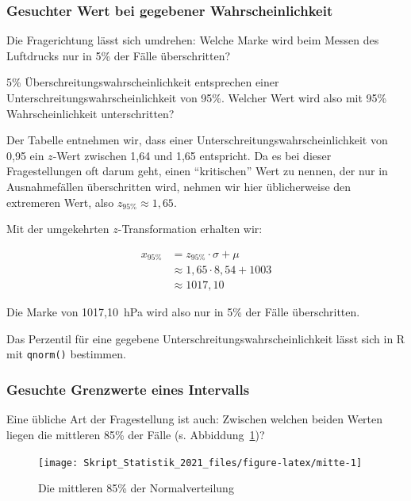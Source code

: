 \documentclass[
  11pt,
  ngerman,
  a4paper,
]{report}
\newenvironment{rtip}{
  \medskip
  \begin{tcolorbox}[colframe=purple,colback=light_gray,title=Softwarehinweis]
}{
  \end{tcolorbox}
  \medskip
}
\begin{document}
\hypertarget{gesuchter-wert-bei-gegebener-wahrscheinlichkeit}{%
\subsubsection{Gesuchter Wert bei gegebener Wahrscheinlichkeit}\label{gesuchter-wert-bei-gegebener-wahrscheinlichkeit}}

Die Fragerichtung lässt sich umdrehen: Welche Marke wird beim Messen des Luftdrucks nur in 5\% der Fälle überschritten?

5\% Überschreitungswahrscheinlichkeit entsprechen einer Unterschreitungswahrscheinlichkeit von 95\%. Welcher Wert wird also mit 95\% Wahrscheinlichkeit unterschritten?

Der Tabelle entnehmen wir, dass einer Unterschreitungswahrscheinlichkeit von 0,95 ein \(z\)-Wert zwischen 1,64 und 1,65 entspricht. Da es bei dieser Fragestellungen oft darum geht, einen \enquote{kritischen} Wert zu nennen, der nur in Ausnahmefällen überschritten wird, nehmen wir hier üblicherweise den extremeren Wert, also \(z_{95\%}\approx 1,65\).

Mit der umgekehrten \(z\)-Transformation erhalten wir:

\[
  \begin{aligned}
    x_{95\%}&=z_{95\%}\cdot \sigma + \mu \\
       &\approx 1{,}65\cdot 8{,}54 + 1003\\
       &\approx 1017{,}10
  \end{aligned}
\]

Die Marke von 1017,10~hPa wird also nur in 5\% der Fälle überschritten.

\begin{rtip}
Das Perzentil für eine gegebene Unterschreitungswahrscheinlichkeit lässt sich in R mit \verb|qnorm()| bestimmen.
\end{rtip}

\hypertarget{gesuchte-grenzwerte-eines-intervalls}{%
\subsubsection{Gesuchte Grenzwerte eines Intervalls}\label{gesuchte-grenzwerte-eines-intervalls}}

Eine übliche Art der Fragestellung ist auch: Zwischen welchen beiden Werten liegen die mittleren 85\% der Fälle (s. Abbiddung~\ref{fig:mitte})?

\begin{figure}[!h]

{\centering \texttt{[image: Skript\_Statistik\_2021\_files/figure-latex/mitte-1]} 

}

\caption{Die mittleren 85\% der Normalverteilung}\label{fig:mitte}
\end{figure}
\end{document}
